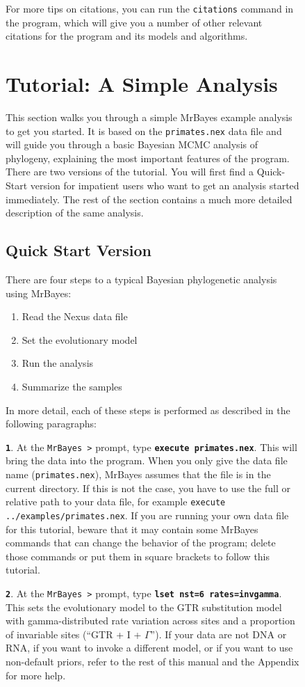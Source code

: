 \documentclass[12pt]{book}
\newcommand{\ttt}[1]{\texttt{#1}}
\newcommand{\tb}[1]{\ttt{\textbf{#1}}}
\begin{document}
\begin{figure}[h]
For more tips on citations, you can run the \ttt{citations} command in the program, which will give
you a number of other relevant citations for the program and its models and algorithms.


\chapter{Tutorial: A Simple Analysis}
\label{tutorialSimple}
This section walks you through a simple MrBayes example analysis to get you started. It is based on
the \ttt{primates.nex} data file and will guide you through a basic Bayesian MCMC analysis of
phylogeny, explaining the most important features of the program. There are two versions of the
tutorial. You will first find a Quick-Start version for impatient users who want to get an analysis
started immediately. The rest of the section contains a much more detailed description of the same
analysis.

\section{Quick Start Version}

There are four steps to a typical Bayesian phylogenetic analysis using MrBayes:
\begin{enumerate}
\item Read the Nexus data file
\item Set the evolutionary model
\item Run the analysis
\item Summarize the samples
\end{enumerate}

In more detail, each of these steps is performed as described in the following paragraphs:

\tb{1}. At the \ttt{MrBayes >} prompt, type \tb{execute primates.nex}. This will bring the data
into the program. When you only give the data file name (\ttt{primates.nex}), MrBayes assumes that
the file is in the current directory. If this is not the case, you have to use the full or relative
path to your data file, for example \ttt{execute ../examples/primates.nex}. If you are running your
own data file for this tutorial, beware that it may contain some MrBayes commands that can change
the behavior of the program; delete those commands or put them in square brackets to follow this
tutorial.

\tb{2}. At the \ttt{MrBayes >} prompt, type \tb{lset nst=6 rates=invgamma}. This sets the
evolutionary model to the GTR substitution model with gamma-distributed rate variation across sites
and a proportion of invariable sites (``GTR + I + $\Gamma$''). If your data are not DNA or RNA, if you
want to invoke a different model, or if you want to use non-default priors, refer to the rest of
this manual and the Appendix for more help.


\end{figure}
\end{document}
